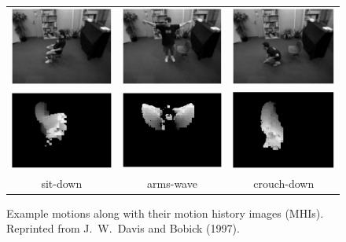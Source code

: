 \begin{figure}[t]
  \centering
  \begin{tabular}{ccc}
    \includegraphics[width=1.5in]{figures/mhi-sit-original.png} &
    \includegraphics[width=1.5in]{figures/mhi-wave-original.png} &
    \includegraphics[width=1.5in]{figures/mhi-crouch-original.png} \\
    \includegraphics[width=1.5in]{figures/mhi-sit-results.png} &
    \includegraphics[width=1.5in]{figures/mhi-wave-results.png} &
    \includegraphics[width=1.5in]{figures/mhi-crouch-results.png} \\
    sit-down & arms-wave & crouch-down 
  \end{tabular}
  \caption[Example motions along with their motion history images
    (MHIs).]{\small Example motions along with their motion history
    images (MHIs). Reprinted from J.\ W.\ Davis and Bobick (1997).}
  \label{fig:mhi}
\end{figure}

